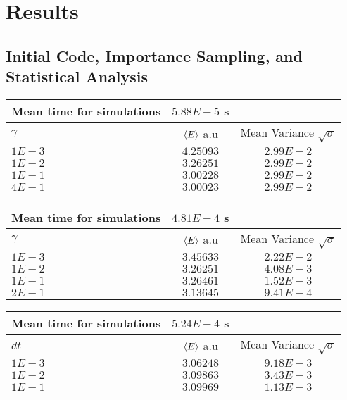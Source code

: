\section{Results}
\subsection{Initial Code, Importance Sampling, and Statistical Analysis}
\begin{table}
\begin{tabular}{l|c|c}
	Mean time for simulations & $5.88E-5$ s & \\
	\hline
	$\gamma$ & $\langle E \rangle$ a.u & Mean Variance $\sqrt{\sigma}$\\
	\hline
	$1E-3$ & $4.25093$ & $2.99E-2$ \\
	$1E-2$ & $3.26251$ & $2.99E-2$ \\
	$1E-1$ & $3.00228$ & $2.99E-2$ \\
	$4E-1$ & $3.00023$ & $2.99E-2$ \\
\end{tabular}
\label{tab:naive-nin}
\end{table}

\begin{table}
\begin{tabular}{l|c|c}
	Mean time for simulations & $4.81E-4$ s & \\
	\hline
	$\gamma$ & $\langle E \rangle$ a.u & Mean Variance $\sqrt{\sigma}$\\
	\hline
	$1E-3$ & $3.45633$ & $2.22E-2$ \\
	$1E-2$ & $3.26251$ & $4.08E-3$ \\
	$1E-1$ & $3.26461$ & $1.52E-3$ \\
	$2E-1$ & $3.13645$ & $9.41E-4$ \\
\end{tabular}
\label{tab:importance-nin-gamma}
\end{table}

\begin{table}
\begin{tabular}{l|c|c}
	Mean time for simulations & $5.24E-4$ s & \\
	\hline
	$dt$ & $\langle E \rangle$ a.u & Mean Variance $\sqrt{\sigma}$\\
	\hline
	$1E-3$ & $3.06248$ & $9.18E-3$ \\
	$1E-2$ & $3.09863$ & $3.43E-3$ \\
	$1E-1$ & $3.09969$ & $1.13E-3$ \\
\end{tabular}
\label{tab:importance-nin-dt}
\end{table}

